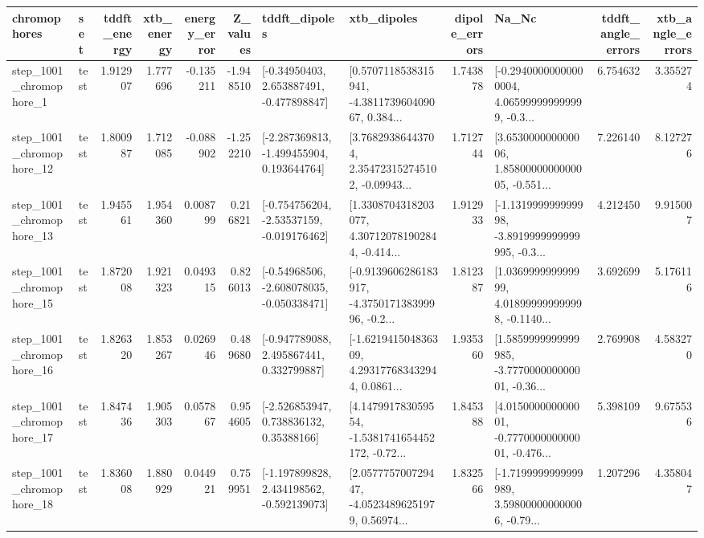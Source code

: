 \begin{tabular}{llrrrrllrlrr}
\toprule
             chromophores &       set &  tddft\_energy &  xtb\_energy &  energy\_error &  Z\_values &                               tddft\_dipoles &                                        xtb\_dipoles &  dipole\_errors &                                              Na\_Nc &  tddft\_angle\_errors &  xtb\_angle\_errors \\
\midrule
  step\_1001\_chromophore\_1 &      test &      1.912907 &    1.777696 &     -0.135211 & -1.948510 &    [-0.34950403, 2.653887491, -0.477898847] &  [0.5707118538315941, -4.381173960409067, 0.384... &       1.743878 &  [-0.29400000000000004, 4.065999999999999, -0.3... &            6.754632 &          3.355274 \\
 step\_1001\_chromophore\_12 &      test &      1.800987 &    1.712085 &     -0.088902 & -1.252210 &   [-2.287369813, -1.499455904, 0.193644764] &  [3.76829386443704, 2.354723152745102, -0.09943... &       1.712744 &  [3.653000000000006, 1.8580000000000005, -0.551... &            7.226140 &          8.127276 \\
 step\_1001\_chromophore\_13 &      test &      1.945561 &    1.954360 &      0.008799 &  0.216821 &   [-0.754756204, -2.53537159, -0.019176462] &  [1.3308704318203077, 4.307120781902844, -0.414... &       1.912933 &  [-1.131999999999998, -3.8919999999999995, -0.3... &            4.212450 &          9.915007 \\
 step\_1001\_chromophore\_15 &      test &      1.872008 &    1.921323 &      0.049315 &  0.826013 &   [-0.54968506, -2.608078035, -0.050338471] &  [-0.9139606286183917, -4.375017138399996, -0.2... &       1.812387 &  [1.036999999999999, 4.018999999999998, -0.1140... &            3.692699 &          5.176116 \\
 step\_1001\_chromophore\_16 &      test &      1.826320 &    1.853267 &      0.026946 &  0.489680 &    [-0.947789088, 2.495867441, 0.332799887] &  [-1.621941504836309, 4.293177683432944, 0.0861... &       1.935360 &  [1.5859999999999985, -3.777000000000001, -0.36... &            2.769908 &          4.583270 \\
 step\_1001\_chromophore\_17 &      test &      1.847436 &    1.905303 &      0.057867 &  0.954605 &     [-2.526853947, 0.738836132, 0.35388166] &  [4.147991783059554, -1.5381741654452172, -0.72... &       1.845388 &  [4.015000000000001, -0.777000000000001, -0.476... &            5.398109 &          9.675536 \\
 step\_1001\_chromophore\_18 &      test &      1.836008 &    1.880929 &      0.044921 &  0.759951 &   [-1.197899828, 2.434198562, -0.592139073] &  [2.057775700729447, -4.05234896251979, 0.56974... &       1.832566 &  [-1.7199999999999989, 3.598000000000006, -0.79... &            1.207296 &          4.358047 \\

\end{tabular}
